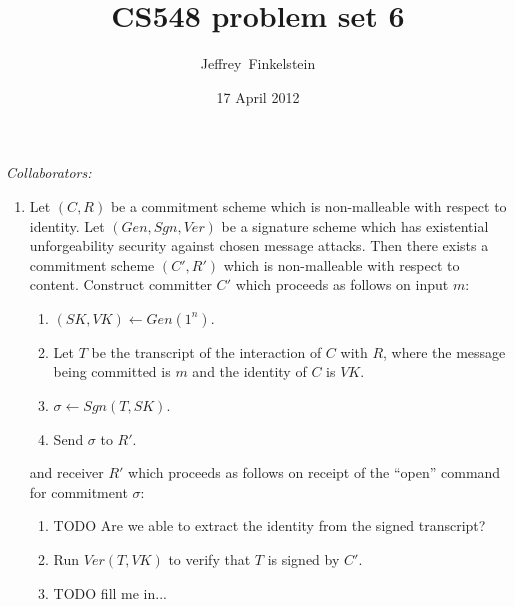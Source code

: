 \documentclass[draft]{article}
\author{Jef{}frey~Finkelstein}
\date{17 April 2012}
\title{CS548 problem set 6}
\newcommand{\collaborators}[1]{\emph{Collaborators: #1}}
\begin{document}
\maketitle
\collaborators{}
\begin{enumerate}
\item
  Let $(C, R)$ be a commitment scheme which is non-malleable with respect to identity.
  Let $(Gen, Sgn, Ver)$ be a signature scheme which has existential unforgeability security against chosen message attacks.
  Then there exists a commitment scheme $(C', R')$ which is non-malleable with respect to content.
  Construct committer $C'$ which proceeds as follows on input $m$:
  \begin{enumerate}
  \item $(SK, VK) \gets Gen(1^n)$.
  \item Let $T$ be the transcript of the interaction of $C$ with $R$, where the message being committed is $m$ and the identity of $C$ is $VK$.
  \item $\sigma\gets Sgn(T, SK)$.
  \item Send $\sigma$ to $R'$.
  \end{enumerate}
  and receiver $R'$ which proceeds as follows on receipt of the ``open'' command for commitment $\sigma$:
  \begin{enumerate}
  \item TODO Are we able to extract the identity from the signed transcript?
  \item Run $Ver(T, VK)$ to verify that $T$ is signed by $C'$.
  \item TODO fill me in...
  \end{enumerate}


\end{enumerate}
\end{document}
